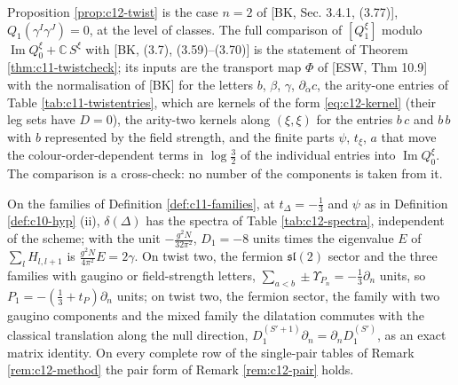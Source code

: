 \begin{remark}
\label{rem:c12-twistcmp}
Proposition \ref{prop:c12-twist} is the case $n=2$ of [BK, Sec. 3.4.1, (3.77)], $Q_1(\gamma^I\gamma^J)=0$, at the level of classes. The full comparison of $[Q^\xi_1]$ modulo $\operatorname{Im}Q^\xi_0+\mathbb C\,S^\xi$ with [BK, (3.7), (3.59)--(3.70)] is the statement of Theorem \ref{thm:c11-twistcheck}; its inputs are the transport map $\Phi$ of [ESW, Thm 10.9] with the normalisation of [BK] for the letters $b$, $\beta$, $\gamma$, $\partial_{\dot\alpha}c$, the arity-one entries of Table \ref{tab:c11-twistentries}, which are kernels of the form \eqref{eq:c12-kernel} (their leg sets have $D=0$), the arity-two kernels along $(\xi,\xi)$ for the entries $b\,c$ and $b\,b$ with $b$ represented by the field strength, and the finite parts $\psi$, $t_\xi$, $a$ that move the colour-order-dependent terms in $\log\tfrac32$ of the individual entries into $\operatorname{Im}Q^\xi_0$. The comparison is a cross-check: no number of the components is taken from it.
\end{remark}

\begin{proposition}
\label{prop:c12-spectra}
On the families of Definition \ref{def:c11-families}, at $t_\Delta=-\tfrac13$ and $\psi$ as in Definition \ref{def:c10-hyp} (ii), $\delta(\Delta)$ has the spectra of Table \ref{tab:c12-spectra}, independent of the scheme; with the unit $-\tfrac{g^2N}{32\pi^2}$, $D_1=-8$ units times the eigenvalue $E$ of $\sum_lH_{l,l+1}$ is $\tfrac{g^2N}{4\pi^2}E=2\gamma$. On twist two, the fermion $\mathfrak{sl}(2)$ sector and the three families with gaugino or field-strength letters, $\sum_{a<b}\pm\Upsilon_{P_n}=-\tfrac13\partial_n$ units, so $P_1=-(\tfrac13+t_P)\partial_n$ units; on twist two, the fermion sector, the family with two gaugino components and the mixed family the dilatation commutes with the classical translation along the null direction, $D_1^{(S'+1)}\partial_n=\partial_nD_1^{(S')}$, as an exact matrix identity. On every complete row of the single-pair tables of Remark \ref{rem:c12-method} the pair form of Remark \ref{rem:c12-pair} holds.
\end{proposition}

